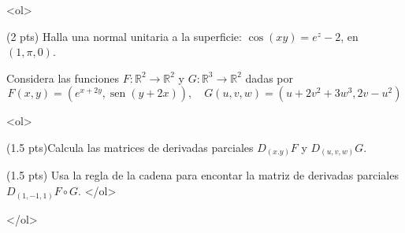 \documentclass[12pt]{article}
\newcommand{\sen}{\operatorname{sen}}
\begin{document}
\bigskip

            
\bigskip
\bigskip
\bigskip


<ol>

  
\item(2 pts) Halla una normal unitaria a la superficie: $\cos(xy)=e^z-2$, en $(1,\pi,0)$.
 


  \vspace{3cm}

\item Considera las funciones $F:\mathbb{R}^2 \to \mathbb{R}^2$ y $G:\mathbb{R}^3 \to \mathbb{R}^2$
  dadas por
  $$
  F(x,y)=(e^{x+2y}, \sen(y+2x)), \quad G(u,v,w)=(u+2v^2+3w^3, 2v-u^2)
  $$

  <ol>
  \item (1.5 pts)Calcula las matrices de derivadas parciales $D_{(x.y)}F$ y $D_{(u,v,w)}G$.
  \item (1.5 pts)  Usa la regla de la cadena para encontar la matriz de derivadas
    parciales  $D_{(1,-1,1)}F\circ G$.
  </ol>
  
</ol>


  
\end{document}
